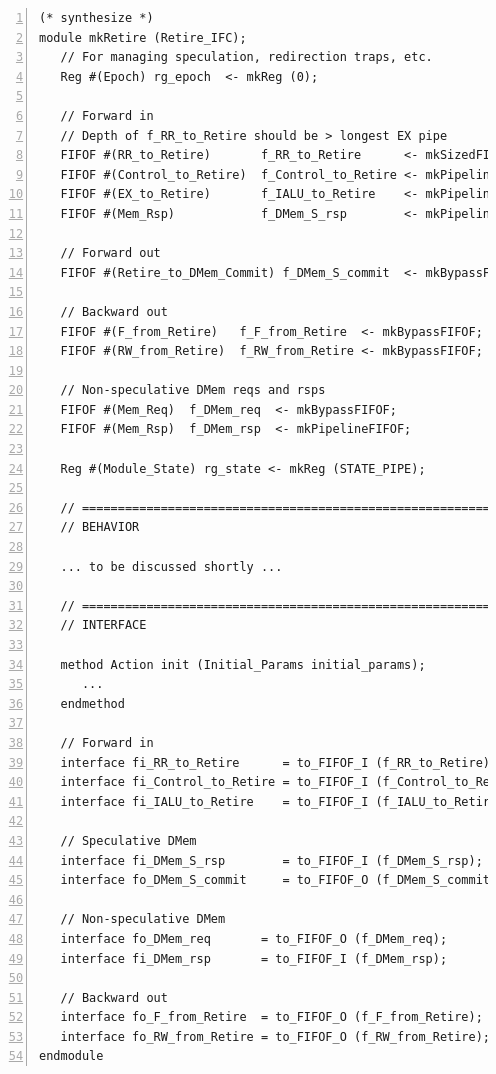 {\small
\begin{Verbatim}[frame=single, numbers=left, label=(In file:src\_Fife/S5\_Retire.bsv)]
(* synthesize *)
module mkRetire (Retire_IFC);
   // For managing speculation, redirection traps, etc.
   Reg #(Epoch) rg_epoch  <- mkReg (0);

   // Forward in
   // Depth of f_RR_to_Retire should be > longest EX pipe
   FIFOF #(RR_to_Retire)       f_RR_to_Retire      <- mkSizedFIFOF (8);
   FIFOF #(Control_to_Retire)  f_Control_to_Retire <- mkPipelineFIFOF;
   FIFOF #(EX_to_Retire)       f_IALU_to_Retire    <- mkPipelineFIFOF;
   FIFOF #(Mem_Rsp)            f_DMem_S_rsp        <- mkPipelineFIFOF;

   // Forward out
   FIFOF #(Retire_to_DMem_Commit) f_DMem_S_commit  <- mkBypassFIFOF;

   // Backward out
   FIFOF #(F_from_Retire)   f_F_from_Retire  <- mkBypassFIFOF;
   FIFOF #(RW_from_Retire)  f_RW_from_Retire <- mkBypassFIFOF;

   // Non-speculative DMem reqs and rsps
   FIFOF #(Mem_Req)  f_DMem_req  <- mkBypassFIFOF;
   FIFOF #(Mem_Rsp)  f_DMem_rsp  <- mkPipelineFIFOF;

   Reg #(Module_State) rg_state <- mkReg (STATE_PIPE);

   // ================================================================
   // BEHAVIOR

   ... to be discussed shortly ...

   // ================================================================
   // INTERFACE

   method Action init (Initial_Params initial_params);
      ...
   endmethod

   // Forward in
   interface fi_RR_to_Retire      = to_FIFOF_I (f_RR_to_Retire);
   interface fi_Control_to_Retire = to_FIFOF_I (f_Control_to_Retire);
   interface fi_IALU_to_Retire    = to_FIFOF_I (f_IALU_to_Retire);

   // Speculative DMem
   interface fi_DMem_S_rsp        = to_FIFOF_I (f_DMem_S_rsp);
   interface fo_DMem_S_commit     = to_FIFOF_O (f_DMem_S_commit);

   // Non-speculative DMem
   interface fo_DMem_req       = to_FIFOF_O (f_DMem_req);
   interface fi_DMem_rsp       = to_FIFOF_I (f_DMem_rsp);

   // Backward out
   interface fo_F_from_Retire  = to_FIFOF_O (f_F_from_Retire);
   interface fo_RW_from_Retire = to_FIFOF_O (f_RW_from_Retire);
endmodule
\end{Verbatim}
}


